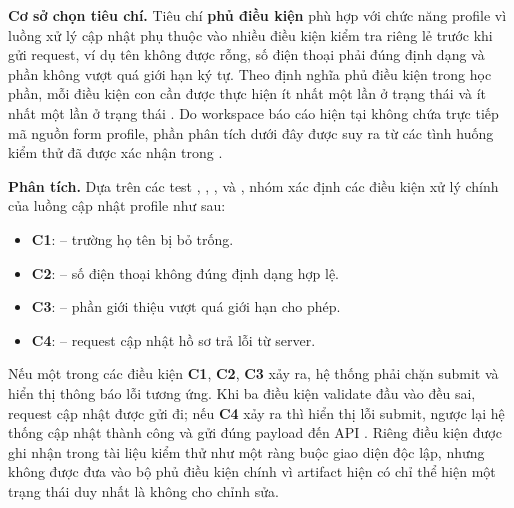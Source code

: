 \textbf{Cơ sở chọn tiêu chí.} Tiêu chí \textbf{phủ điều kiện} phù hợp với chức năng profile vì luồng xử lý cập nhật phụ thuộc vào nhiều điều kiện kiểm tra riêng lẻ trước khi gửi request, ví dụ tên không được rỗng, số điện thoại phải đúng định dạng và phần  không vượt quá giới hạn ký tự. Theo định nghĩa phủ điều kiện trong học phần, mỗi điều kiện con cần được thực hiện ít nhất một lần ở trạng thái  và ít nhất một lần ở trạng thái . Do workspace báo cáo hiện tại không chứa trực tiếp mã nguồn form profile, phần phân tích dưới đây được suy ra từ các tình huống kiểm thử đã được xác nhận trong .

\textbf{Phân tích.} Dựa trên các test , , ,  và , nhóm xác định các điều kiện xử lý chính của luồng cập nhật profile như sau:

\begin{itemize}
	\item \textbf{C1}:  -- trường họ tên bị bỏ trống.
	\item \textbf{C2}:  -- số điện thoại không đúng định dạng hợp lệ.
	\item \textbf{C3}:  -- phần giới thiệu vượt quá giới hạn cho phép.
	\item \textbf{C4}:  -- request cập nhật hồ sơ trả lỗi từ server.
\end{itemize}

Nếu một trong các điều kiện \textbf{C1}, \textbf{C2}, \textbf{C3} xảy ra, hệ thống phải chặn submit và hiển thị thông báo lỗi tương ứng. Khi ba điều kiện validate đầu vào đều sai, request cập nhật được gửi đi; nếu \textbf{C4} xảy ra thì hiển thị lỗi submit, ngược lại hệ thống cập nhật thành công và gửi đúng payload đến API . Riêng điều kiện  được ghi nhận trong tài liệu kiểm thử như một ràng buộc giao diện độc lập, nhưng không được đưa vào bộ phủ điều kiện chính vì artifact hiện có chỉ thể hiện một trạng thái duy nhất là không cho chỉnh sửa.

